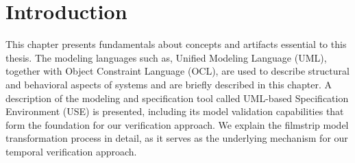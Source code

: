 \setlength{\parindent}{1cm}

\section{Introduction}

\hspace{1cm} This chapter presents fundamentals about concepts and artifacts essential 
to this thesis. The modeling languages such as, Unified Modeling Language (UML), 
together with Object Constraint Language (OCL), are used to describe structural and 
behavioral aspects of systems and are briefly described in this chapter. A description 
of the modeling and specification tool called UML-based Specification Environment (USE)
is presented, including its model validation capabilities that form the foundation for 
our verification approach. We explain the filmstrip model transformation process in 
detail, as it serves as the underlying mechanism for our temporal verification approach.
